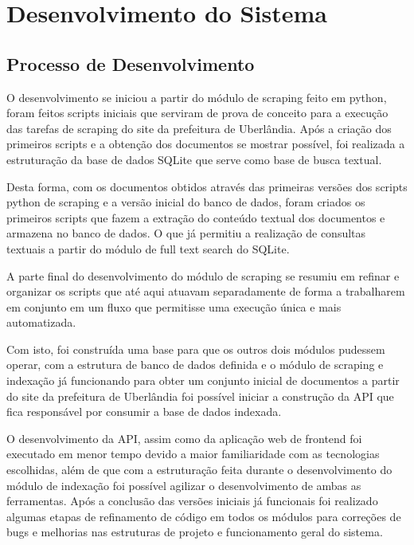 \chapter[Desenvolvimento do Sistema]{Desenvolvimento do Sistema}
\section{Processo de Desenvolvimento}

O desenvolvimento se iniciou a partir do módulo de scraping feito em python, foram feitos scripts iniciais que serviram de prova de conceito para a execução das tarefas de scraping do site da prefeitura de Uberlândia. Após a criação dos primeiros scripts e a obtenção dos documentos se mostrar possível, foi realizada a estruturação da base de dados SQLite que serve como base de busca textual.

Desta forma, com os documentos obtidos através das primeiras versões dos scripts python de scraping e a versão inicial do banco de dados, foram criados os primeiros scripts que fazem a extração do conteúdo textual dos documentos e armazena no banco de dados. O que já permitiu a realização de consultas textuais a partir do módulo de full text search do SQLite.

A parte final do desenvolvimento do módulo de scraping se resumiu em refinar e organizar os scripts que até aqui atuavam separadamente de forma a trabalharem em conjunto em um fluxo que permitisse uma execução única e mais automatizada.

Com isto, foi construída uma base para que os outros dois módulos pudessem operar, com a estrutura de banco de dados definida e o módulo de scraping e indexação já funcionando para obter um conjunto inicial de documentos a partir do site da prefeitura de Uberlândia foi possível iniciar a construção da API que fica responsável por consumir a base de dados indexada.

O desenvolvimento da API, assim como da aplicação web de frontend foi executado em menor tempo devido a maior familiaridade com as tecnologias escolhidas, além de que com a estruturação feita durante o desenvolvimento do módulo de indexação foi possível agilizar o desenvolvimento de ambas as ferramentas. Após a conclusão das versões iniciais já funcionais foi realizado algumas etapas de refinamento de código em todos os módulos para correções de bugs e melhorias nas estruturas de projeto e funcionamento geral do sistema.
